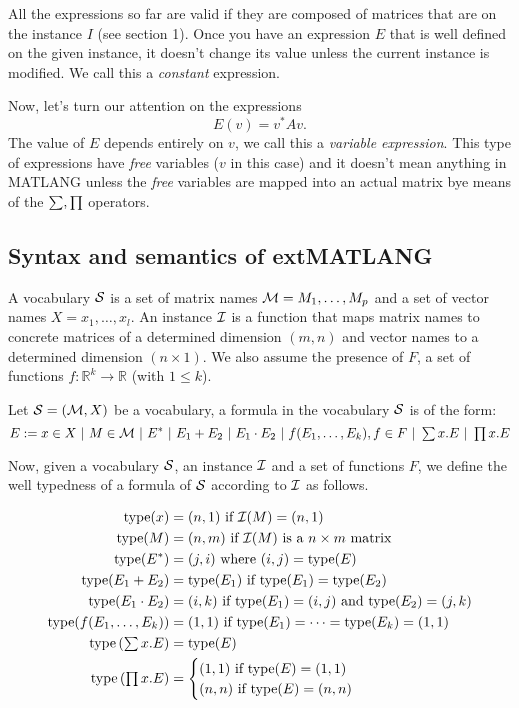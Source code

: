 All the expressions so far are valid if they are composed of matrices that are on the instance $I$ (see section 1). Once you have an expression $E$ that is well defined on the given instance, it doesn't change its value unless the current instance is modified. We call this a \textit{constant} expression.

Now, let's turn our attention on the expressions $$E(v)=v^* Av.$$ The value of $E$ depends entirely on $v$, we call this a \textit{variable expression}. This type of expressions have \textit{free} variables ($v$ in this case) and it doesn't mean anything in MATLANG unless the \textit{free} variables are mapped into an actual matrix bye means of the $\textstyle\sum,\textstyle\prod$ operators.

\subsection{Syntax and semantics of  extMATLANG}

A vocabulary $\mathcal{S}$ is a set of matrix names $\mathcal{M}=M_1,\ldots, M_p$ and a set of vector names $X=x_1,\ldots, x_l$.
An instance $\mathcal{I}$ is a function that maps matrix names to concrete matrices of a determined dimension $(m,n)$ and vector names to a determined dimension $(n\times 1)$. 
We also assume the presence of $F$, a set of functions $f:\mathbb{R}^{k}\rightarrow\mathbb{R}$ (with $1\leq k$).

Let $\mathcal{S}=(\mathcal{M}, X)$ be a vocabulary, a formula in the vocabulary $\mathcal{S}$ is of the form:
$$
E:= x\in X \ |\ M\in \cM \ |\  E^* \ |\ E_1+E_2 \ |\  E_1\cdot E_2 \ |\  f(E_1,\ldots, E_k), f\in F \ |\  \ssum x. E \ |\  \sprod x. E
$$

Now, given a vocabulary $\mathcal{S}$, an instance $\mathcal{I}$ and a set of functions $F$, we define the well typedness of a formula of $\mathcal{S}$ according to $\mathcal{I}$ as follows. 

\begin{align*}
\text{type}(x) &= (n,1) \text{ if } \mathcal{I}(M) = (n, 1) \\
\text{type}(M) &= (n,m) \text{ if } \mathcal{I}(M) \text{ is a } n\times m \text{ matrix } \\
\text{type}(E^*)&=(j,i) \text{ where } (i,j)=\text{type}(E) \\
\text{type}(E_1 + E_2) &= \text{type}(E_1) \text{ if } \text{type}(E_1)=\text{type}(E_2) \\
\text{type}(E_1\cdot E_2)&= (i,k) \text{ if } \text{type}(E_1)=(i,j)\text{ and type}(E_2)=(j,k) \\
\text{type}(f(E_1,\ldots, E_k))&=(1,1) \text{ if } \text{type}(E_1)=\cdots =\text{type}(E_k)=(1,1) \\
\text{type}\left(\textstyle\sum x.E\right) &= \text{type}(E) \\
\text{type}\left(\textstyle\prod x. E\right) &=
\begin{cases}
               (1,1) \text{ if } \text{type}(E)=(1,1) \\
               (n,n) \text{ if } \text{type}(E)=(n,n)
            \end{cases}
\end{align*}

